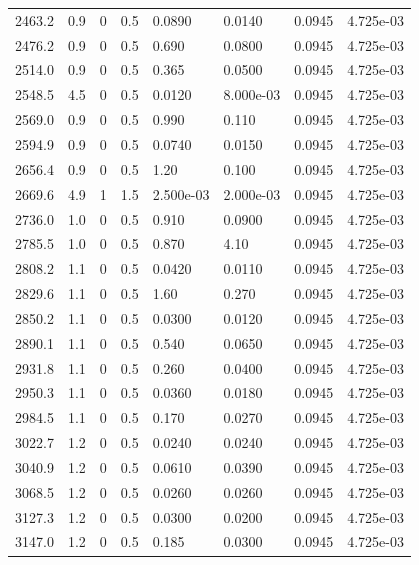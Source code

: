 \documentclass[preview]{standalone}
\begin{document}
{{{\begin{tabular}{L{1.2cm}C{1.2cm} C{0.3cm}C{0.5cm} C{1.4cm}C{1.4cm} C{1.4cm}C{1.4cm}}
  2463.2  &   0.9  & 0     & 0.5 &  0.0890  & 0.0140  & 0.0945 &  4.725e-03   \\ 
  2476.2  &   0.9  & 0     & 0.5 &  0.690  & 0.0800  & 0.0945 &  4.725e-03   \\ 
  2514.0  &   0.9  & 0     & 0.5 &  0.365  & 0.0500  & 0.0945 &  4.725e-03   \\ 
  2548.5  &   4.5  & 0     & 0.5 &  0.0120  & 8.000e-03  & 0.0945 &  4.725e-03   \\ 
  2569.0  &   0.9  & 0     & 0.5 &  0.990  & 0.110  & 0.0945 &  4.725e-03   \\ 
  2594.9  &   0.9  & 0     & 0.5 &  0.0740  & 0.0150  & 0.0945 &  4.725e-03   \\ 
  2656.4  &   0.9  & 0     & 0.5 &  1.20  & 0.100  & 0.0945 &  4.725e-03   \\ 
  2669.6  &   4.9  & 1     & 1.5 &  2.500e-03  & 2.000e-03  & 0.0945 &  4.725e-03   \\ 
  2736.0  &   1.0  & 0     & 0.5 &  0.910  & 0.0900  & 0.0945 &  4.725e-03   \\ 
  2785.5  &   1.0  & 0     & 0.5 &  0.870  & 4.10  & 0.0945 &  4.725e-03   \\ 
  2808.2  &   1.1  & 0     & 0.5 &  0.0420  & 0.0110  & 0.0945 &  4.725e-03   \\ 
  2829.6  &   1.1  & 0     & 0.5 &  1.60  & 0.270  & 0.0945 &  4.725e-03   \\ 
  2850.2  &   1.1  & 0     & 0.5 &  0.0300  & 0.0120  & 0.0945 &  4.725e-03   \\ 
  2890.1  &   1.1  & 0     & 0.5 &  0.540  & 0.0650  & 0.0945 &  4.725e-03   \\ 
  2931.8  &   1.1  & 0     & 0.5 &  0.260  & 0.0400  & 0.0945 &  4.725e-03   \\ 
  2950.3  &   1.1  & 0     & 0.5 &  0.0360  & 0.0180  & 0.0945 &  4.725e-03   \\ 
  2984.5  &   1.1  & 0     & 0.5 &  0.170  & 0.0270  & 0.0945 &  4.725e-03   \\ 
  3022.7  &   1.2  & 0     & 0.5 &  0.0240  & 0.0240  & 0.0945 &  4.725e-03   \\ 
  3040.9  &   1.2  & 0     & 0.5 &  0.0610  & 0.0390  & 0.0945 &  4.725e-03   \\ 
  3068.5  &   1.2  & 0     & 0.5 &  0.0260  & 0.0260  & 0.0945 &  4.725e-03   \\ 
  3127.3  &   1.2  & 0     & 0.5 &  0.0300  & 0.0200  & 0.0945 &  4.725e-03   \\ 
  3147.0  &   1.2  & 0     & 0.5 &  0.185  & 0.0300  & 0.0945 &  4.725e-03   \\ 

\end{tabular}}}}
\end{document}
